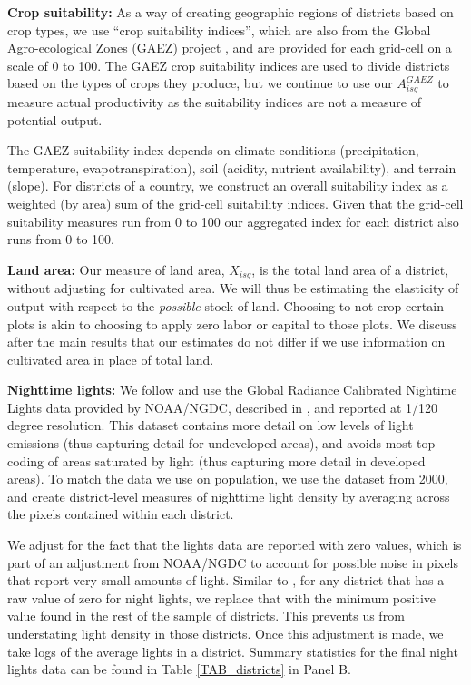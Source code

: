 \documentclass[11pt]{article}
\begin{document}
\vspace{.5cm}\noindent\textbf{Crop suitability:} As a way of creating geographic regions of districts based on crop types, we use ``crop suitability indices'', which are also from the Global Agro-ecological Zones (GAEZ) project \citep{gaez}, and are provided for each grid-cell on a scale of 0 to 100. The GAEZ crop suitability indices are used to divide districts based on the types of crops they produce, but we continue to use our $A^{GAEZ}_{isg}$ to measure actual productivity as the suitability indices are not a measure of potential output.

The GAEZ suitability index depends on climate conditions (precipitation, temperature, evapotranspiration), soil (acidity, nutrient availability), and terrain (slope). For districts of a country, we construct an overall suitability index as a weighted (by area) sum of the grid-cell suitability indices. Given that the grid-cell suitability measures run from 0 to 100  our aggregated index for each district also runs from 0 to 100.

\vspace{.5cm}\noindent\textbf{Land area:} Our measure of land area, $X_{isg}$, is the total land area of a district, without adjusting for cultivated area. We will thus be estimating the elasticity of output with respect to the \textit{possible} stock of land. Choosing to not crop certain plots is akin to choosing to apply zero labor or capital to those plots. We discuss after the main results that our estimates do not differ if we use information on cultivated area in place of total land.

\vspace{.5cm}\noindent\textbf{Nighttime lights:} We follow \citet{hssw2016} and use the Global Radiance Calibrated Nightime Lights data provided by NOAA/NGDC, described in \citet{Elvidge1999}, and reported at 1/120 degree resolution. This dataset contains more detail on low levels of light emissions (thus capturing detail for undeveloped areas), and avoids most top-coding of areas saturated by light (thus capturing more detail in developed areas). To match the data we use on population, we use the dataset from 2000, and create district-level measures of nighttime light density by averaging across the pixels contained within each district.

We adjust for the fact that the lights data are reported with zero values, which is part of an adjustment from NOAA/NGDC to account for possible noise in pixels that report very small amounts of light. Similar to \citet{hssw2016}, for any district that has a raw value of zero for night lights, we replace that with the minimum positive value found in the rest of the sample of districts. This prevents us from understating light density in those districts. Once this adjustment is made, we take logs of the average lights in a district. Summary statistics for the final night lights data can be found in Table \ref{TAB_districts} in Panel B.
\end{document}
